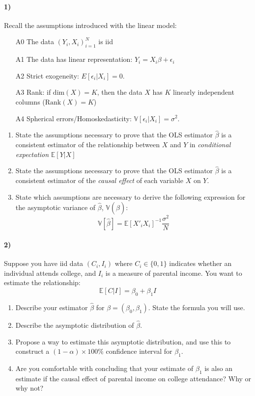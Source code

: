 \documentclass[12pt]{article}
\newcommand\BB{\mathbb}
\newcommand\EE{\mathbb{E}}
\newcommand\h{\hat}
\newcommand\eps{\epsilon}
\numberwithin{equation}{section}
\numberwithin{figure}{section}
\numberwithin{table}{section}
\begin{document}
\paragraph{1)} Recall the assumptions introduced with the linear model:
\begin{itemize}
\item[A0] The data $(Y_i,X_i)_{i=1}^N$ is iid
\item[A1] The data has linear representation: $Y_i = X_i\beta + \eps_i$
\item[A2] Strict exogeneity: $E[\eps_i|X_i]=0$.
\item[A3] Rank: if $\text{dim}(X)=K$, then the data $X$ has $K$ linearly independent columns ($\text{Rank}(X)=K$)
\item[A4] Spherical errors/Homoskedasticity: $\BB{V}[\eps_i|X_i] = \sigma^2$.
\end{itemize}
\begin{enumerate}
\item State the assumptions necessary to prove that the OLS estimator $\h\beta$ is a consistent estimator of the relationship between $X$ and $Y$ in \emph{conditional expectation} $\mathbb{E}[Y|X]$
\item State the assumptions necessary to prove that the OLS estimator $\h\beta$ is a consistent estimator of the \emph{causal effect} of each variable $X$ on $Y$.
\item State which assumptions are necessary to derive the following expression for the asymptotic variance of $\h{\beta}$, $\mathbb{V}(\h\beta)$:
  \[ \BB{V}[\h\beta] = \EE[X'_iX_i]^{-1}\frac{\sigma^2}{N} \]
\end{enumerate}


\paragraph{2)} Suppose you have iid data $(C_i,I_i)$ where $C_i\in\{0,1\}$ indicates whether an individual attends college, and $I_i$ is a measure of parental income. You want to estimate the relationship:
\[ \EE[C|I] = \beta_0 + \beta_1 I \]
\begin{enumerate}
\item Describe your estimator $\h\beta$ for $\beta=(\beta_0,\beta_1)$. State the formula you will use.
\item Describe the asymptotic distribution  of $\h\beta$.
\item Propose a way to estimate this asymptotic distribution, and use this to construct a $(1-\alpha)\times100\%$ confidence interval for $\beta_1$.
\item Are you comfortable with concluding that your estimate of $\beta_1$ is also an estimate if the causal effect of parental income on college attendance? Why or why not?
\end{enumerate}
\end{document}
